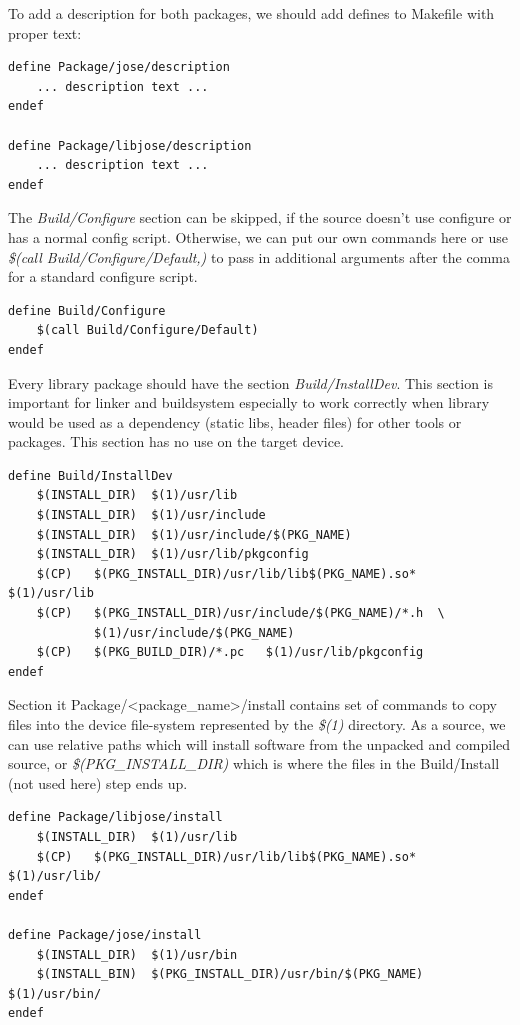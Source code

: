 To add a description for both packages, we should add defines to Makefile with proper text:
\begin{lstlisting}[columns=fixed,basicstyle=\ttfamily\footnotesize,tabsize=4,backgroundcolor=\color{yellow!10}]
define Package/jose/description
	... description text ...
endef

define Package/libjose/description
	... description text ...
endef
\end{lstlisting}
The {\it Build/Configure} section can be skipped, if the source doesn't use configure or has a normal config script. Otherwise, we can put our own commands here or use {\it \$(call Build/Configure/Default,)} to pass in additional arguments after the comma for a standard configure script.
\begin{lstlisting}[columns=fixed,basicstyle=\ttfamily\footnotesize,tabsize=4,backgroundcolor=\color{yellow!10}]
define Build/Configure
	$(call Build/Configure/Default)
endef
\end{lstlisting}
Every library package should have the section {\it Build/InstallDev}.
This section is important for linker and buildsystem especially to work correctly when library would be used as a dependency (static libs, header files) for other tools or packages.
This section has no use on the target device.
\begin{lstlisting}[columns=fixed,basicstyle=\ttfamily\footnotesize,tabsize=4,backgroundcolor=\color{yellow!10}]
define Build/InstallDev
	$(INSTALL_DIR)	$(1)/usr/lib
	$(INSTALL_DIR)  $(1)/usr/include
	$(INSTALL_DIR)	$(1)/usr/include/$(PKG_NAME)
	$(INSTALL_DIR)	$(1)/usr/lib/pkgconfig
	$(CP)	$(PKG_INSTALL_DIR)/usr/lib/lib$(PKG_NAME).so*	$(1)/usr/lib
	$(CP)	$(PKG_INSTALL_DIR)/usr/include/$(PKG_NAME)/*.h	\
			$(1)/usr/include/$(PKG_NAME)
	$(CP)	$(PKG_BUILD_DIR)/*.pc	$(1)/usr/lib/pkgconfig
endef
\end{lstlisting}
Section {it Package/<package\_name>/install} contains set of commands to copy files into the device file-system represented by the {\it \$(1)} directory.
As a source, we can use relative paths which will install software from the unpacked and compiled source, or {\it \$(PKG\_INSTALL\_DIR)} which is where the files in the Build/Install (not used here) step ends up.
\begin{lstlisting}[columns=fixed,basicstyle=\ttfamily\footnotesize,tabsize=4,backgroundcolor=\color{yellow!10}]
define Package/libjose/install
	$(INSTALL_DIR)	$(1)/usr/lib
	$(CP)	$(PKG_INSTALL_DIR)/usr/lib/lib$(PKG_NAME).so*	$(1)/usr/lib/
endef

define Package/jose/install
	$(INSTALL_DIR)	$(1)/usr/bin
	$(INSTALL_BIN)	$(PKG_INSTALL_DIR)/usr/bin/$(PKG_NAME)	$(1)/usr/bin/
endef
\end{lstlisting}
